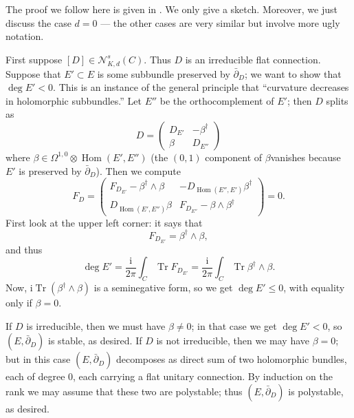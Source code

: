 \documentclass[12pt,letterpaper,reqno]{article}
\numberwithin{equation}{section}
\newcommand{\cN}{\ensuremath{\mathcal N}}
\newcommand{\I}{{\mathrm i}}
\DeclareMathOperator{\Tr}{Tr}
\DeclareMathOperator{\Hom}{Hom}
\begin{document}
\begin{pf} The proof we follow here is given in \cite{MR710055}.
We only give a sketch.
Moreover, we just discuss the case $d=0$ --- the other cases are
very similar but involve more ugly notation.

First suppose $[D] \in \cN^s_{K,d}(C)$. Thus $D$
is an irreducible flat connection. Suppose that $E' \subset E$ is some
subbundle preserved by $\bar\partial_D$; we want to show that $\deg E' < 0$.
This is an instance of the general principle that ``curvature decreases
in holomorphic subbundles.'' 
Let $E''$ be the orthocomplement of $E'$; then $D$ splits as
\begin{equation} \label{eq:connection-split}
  D = \begin{pmatrix} D_{E'} & - \beta^\dagger \\ \beta & D_{E''} \end{pmatrix}
\end{equation}
where $\beta \in \Omega^{1,0} \otimes \Hom(E',E'')$ (the $(0,1)$ component
of $\beta $vanishes because $E'$ is preserved by $\bar\partial_D$). 
Then we compute
\begin{equation} \label{eq:extension-curvature}
  F_D = \begin{pmatrix} F_{D_{E'}} - \beta^\dagger \wedge \beta & - D_{\Hom(E'',E')} \beta^\dagger \\ D_{\Hom(E',E'')} \beta & F_{D_{E''}} - \beta \wedge \beta^\dagger \end{pmatrix} = 0.
\end{equation}
First look at the upper left corner: it says that
\begin{equation}
  F_{D_{E'}} = \beta^\dagger \wedge \beta,
\end{equation}
and thus
\begin{equation}
 \deg E' = \frac{\I}{2 \pi} \int_C \Tr F_{D_{E'}} = \frac{\I}{2 \pi} \int_C \Tr \beta^\dagger \wedge \beta.
\end{equation}
Now, $\I \Tr (\beta^\dagger \wedge \beta)$ is a seminegative form,
so we get $\deg E' \le 0$, with equality only if $\beta = 0$.

If $D$ is irreducible, then
we must have $\beta \neq 0$; in that case we get $\deg E' < 0$,
so $(E,\bar\partial_D)$ is stable, as desired.
If $D$ is not irreducible, then we may have $\beta = 0$;
but in this case $(E,\bar\partial_D)$ decomposes as direct sum
of two holomorphic bundles, each of degree $0$, each carrying a 
flat unitary connection. By induction on the rank we may assume
that these two are polystable; thus 
$(E,\bar\partial_D)$ is polystable, as desired.


\end{pf}
\end{document}
